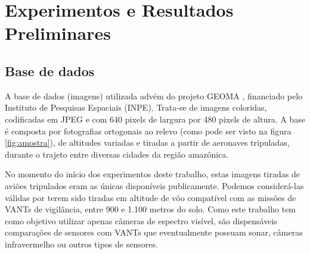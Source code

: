 \chapter{Experimentos e Resultados Preliminares}\label{cap:experimentos}

\section{Base de dados}

A base de dados (imagens) utilizada advém do projeto GEOMA \cite{geoma}, financiado pelo Instituto de Pesquisas Espaciais (INPE). Trata-se de imagens coloridas, codificadas em JPEG e com 640 pixels de largura por 480 pixels de altura. A base é composta por fotografias ortogonais ao relevo (como pode ser visto na figura \ref{fig:amostra}), de altitudes variadas e tiradas a partir de aeronaves tripuladas, durante o trajeto entre diversas cidades da região amazônica.

No momento do início dos experimentos deste trabalho, estas imagens tiradas de aviões tripulados eram as únicas disponíveis publicamente. Podemos considerá-las válidas por terem sido tiradas em altitude de vôo compatível com as missões de VANTs de vigilância, entre 900 e 1.100 metros do solo. Como este trabalho tem como objetivo utilizar apenas câmeras de espectro visível, são dispensáveis comparações de sensores com VANTs que eventualmente possuam sonar, câmeras infravermelho ou outros tipos de sensores.

